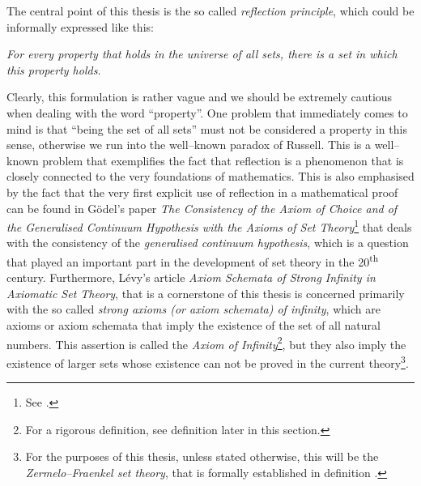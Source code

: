 The central point of this thesis is the so called \emph{reflection principle}, which could be informally expressed like this:
\begin{displayquote}
\emph{For every property that holds in the universe of all sets, there is a set in which this property holds.}
\end{displayquote}

Clearly, this formulation is rather vague and we should be extremely cautious when dealing with the word ``property''. 
One problem that immediately comes to mind is that ``being the set of all sets'' must not be considered a property in this sense, otherwise we run into the well–known paradox of Russell.
This is a well–known problem that exemplifies the fact that reflection is a phenomenon that is closely connected to the very foundations of mathematics.
This is also emphasised by the fact that the very first explicit use of reflection in a mathematical proof can be found in Gödel's paper \emph{The Consistency of the Axiom of Choice and of the Generalised Continuum Hypothesis with the Axioms of Set Theory}\footnote{See \cite{Godel1940consistency}.}
that deals with the consistency of the \emph{generalised continuum hypothesis}, which is a question that played an important part in the development of set theory in the 20\textsuperscript{th} century.
Furthermore, Lévy's article \emph{Axiom Schemata of Strong Infinity in Axiomatic Set Theory}, that is a cornerstone of this thesis is concerned primarily with the so called \emph{strong axioms (or axiom schemata) of infinity}, which are axioms or axiom schemata that imply the existence of the set of all natural numbers. This assertion is called the \emph{Axiom of Infinity}\footnote{For a rigorous definition, see definition  later in this section.}, but they also imply the existence of larger sets whose existence can not be proved in the current theory\footnote{For the purposes of this thesis, unless stated otherwise, this will be the \emph{Zermelo–Fraenkel set theory}, that is formally established in definition .}.

